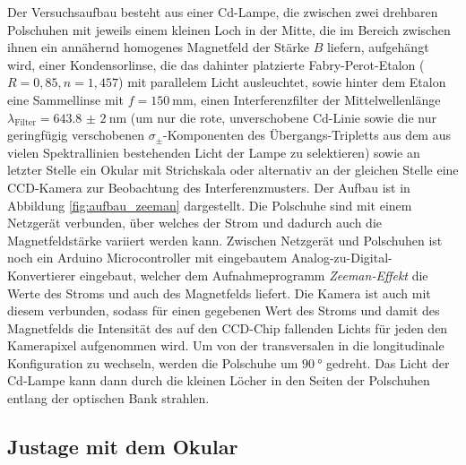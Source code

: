 Der Versuchsaufbau besteht aus einer Cd-Lampe, die zwischen zwei drehbaren Polschuhen mit jeweils einem kleinen Loch in der Mitte, die im Bereich zwischen ihnen ein annähernd homogenes Magnetfeld der Stärke $B$ liefern, aufgehängt wird, einer Kondensorlinse, die das dahinter platzierte Fabry-Perot-Etalon ($R=0,85, n=1,457$) mit parallelem Licht ausleuchtet, sowie hinter dem Etalon eine Sammellinse mit $f=\SI{150}{\milli\meter}$, einen Interferenzfilter der Mittelwellenlänge $\lambda_\text{Filter}=\SI{643.8(20)}{\nano\meter}$ (um nur die rote, unverschobene Cd-Linie sowie die nur geringfügig verschobenen $\sigma_\pm$-Komponenten des Übergangs-Tripletts aus dem aus vielen Spektrallinien bestehenden Licht der Lampe zu selektieren) sowie an letzter Stelle ein Okular mit Strichskala oder alternativ an der gleichen Stelle eine CCD-Kamera zur Beobachtung des Interferenzmusters. Der Aufbau ist in Abbildung \ref{fig:aufbau_zeeman} dargestellt. Die Polschuhe sind mit einem Netzgerät verbunden, über welches der Strom und dadurch auch die Magnetfeldstärke variiert werden kann. Zwischen Netzgerät und Polschuhen ist noch ein Arduino Microcontroller mit eingebautem Analog-zu-Digital-Konvertierer eingebaut, welcher dem Aufnahmeprogramm \textit{Zeeman-Effekt} die Werte des Stroms und auch des Magnetfelds liefert. Die Kamera ist auch mit diesem verbunden, sodass für einen gegebenen Wert des Stroms und damit des Magnetfelds die Intensität des auf den CCD-Chip fallenden Lichts für jeden den Kamerapixel aufgenommen wird. Um von der transversalen in die longitudinale Konfiguration zu wechseln, werden die Polschuhe um $\SI{90}{\degree}$ gedreht. Das Licht der Cd-Lampe kann dann durch die kleinen Löcher in den Seiten der Polschuhen entlang der optischen Bank strahlen.


\subsection{Justage mit dem Okular}

